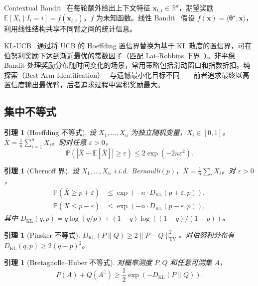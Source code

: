 \documentclass[UTF8,a4paper,11pt,zihao=5]{ctexart}
\newtheorem{lemma}[theorem]{引理}
\newcommand{\R}{\mathbb{R}}
\newcommand{\E}{\mathbb{E}}
\newcommand{\Pbb}{\mathbb{P}}
\newcommand{\KL}{D_{\mathrm{KL}}}
\begin{document}
Contextual Bandit~\cite{li2010} 在每轮额外给出上下文特征 $\bm{x}_{t,i} \in \R^d$，期望奖励 $\E[X_t \mid I_t = i] = f(\bm{x}_{t,i})$，$f$ 为未知函数。线性 Bandit~\cite{abbasi2011} 假设 $f(\bm{x}) = \langle \bm{\theta}^\star, \bm{x} \rangle$，利用线性结构共享不同臂之间的统计信息。

KL-UCB~\cite{garivier2011} 通过将 UCB 的 Hoeffding 置信界替换为基于 KL 散度的置信界，可在伯努利奖励下达到渐近最优的常数因子（匹配 Lai--Robbins 下界~\cite{lai1985}）。非平稳 Bandit 处理奖励分布随时间变化的场景，常用策略包括滑动窗口和指数折扣。纯探索（Best Arm Identification）~\cite{dann2017} 与遗憾最小化目标不同——前者追求最终以高置信度输出最优臂，后者追求过程中累积奖励最大。

\subsection{集中不等式}

\begin{lemma}[Hoeffding 不等式]\label{lem:hoeffding}
设 $X_1, \dots, X_n$ 为独立随机变量，$X_i \in [0, 1]$。$\bar{X} = \frac{1}{n}\sum_{i=1}^{n} X_i$。则对任意 $\varepsilon > 0$，
\begin{equation}
    \Pbb(|\bar{X} - \E[\bar{X}]| \geq \varepsilon) \leq 2 \exp(-2n \varepsilon^2).
\end{equation}
\end{lemma}

\begin{lemma}[Chernoff 界]\label{lem:chernoff}
设 $X_1, \dots, X_n$ i.i.d.\ Bernoulli$(p)$，$\bar{X} = \frac{1}{n}\sum_i X_i$。对 $\varepsilon > 0$，
\begin{align}
    \Pbb(\bar{X} \geq p + \varepsilon) &\leq \exp(-n \cdot \KL(p+\varepsilon, p)), \\
    \Pbb(\bar{X} \leq p - \varepsilon) &\leq \exp(-n \cdot \KL(p-\varepsilon, p)),
\end{align}
其中 $\KL(q, p) = q \log(q/p) + (1-q) \log((1-q)/(1-p))$。
\end{lemma}

\begin{lemma}[Pinsker 不等式]\label{lem:pinsker}
$\KL(P\|Q) \geq 2\|P - Q\|_{\mathrm{TV}}^2$。对伯努利分布有 $\KL(q, p) \geq 2(q-p)^2$。
\end{lemma}

\begin{lemma}[Bretagnolle--Huber 不等式]\label{lem:bh}
对概率测度 $P, Q$ 和任意可测集 $A$，
\begin{equation}
    P(A) + Q(A^{\complement}) \geq \frac{1}{2} \exp(-\KL(P\|Q)).
\end{equation}
\end{lemma}
\end{document}
